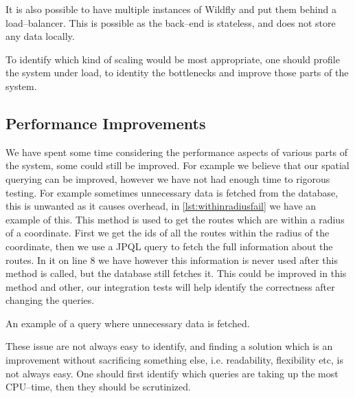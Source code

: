 It is also possible to have multiple instances of Wildfly and put them behind a load--balancer.
This is possible as the back--end is stateless, and does not store any data locally. 

To identify which kind of scaling would be most appropriate, one should profile the system under load, to identity the bottlenecks and improve those parts of the system. 

\subsection{Performance Improvements}
We have spent some time considering the performance aspects of various parts of the system, some could still be improved.
For example we believe that our spatial querying can be improved, however we have not had enough time to rigorous testing.
For example sometimes unnecessary data is fetched from the database, this is unwanted as it causes overhead, in \cref{lst:withinradiusfail} we have an example of this.
This method is used to get the routes which are within a radius of a coordinate.
First we get the ids of all the routes within the radius of the coordinate, then we use a \ac{JPQL} query to fetch the full information about the routes.
In it on line 8 we have  however this information is never used after this method is called, but the database still fetches it.
This could be improved in this method and other, our integration tests will help identify the correctness after changing the queries.
\begin{listing}
    \begin{java2}
        Set<Long> routes = routeIdsWithinRadius(waypointDao, coordinate, radius);
        if (routes.isEmpty())
            return new ArrayList<>();

        TypedQuery<Route> query = em.createQuery(
            "SELECT DISTINCT r " +
                "FROM Route r " +
                "JOIN FETCH r.points " +
                "JOIN FETCH r.vehicle v " +
                "JOIN FETCH r.driver d " +
                "WHERE r.id IN :routes",
            Route.class);

        query.setParameter("routes", routes);
        return query.getResultList();
    }
    \end{java2}
    \caption{An example of a query where unnecessary data is fetched.}
    \label{lst:withinradiusfail}
\end{listing}
These issue are not always easy to identify, and finding a solution which is an improvement without sacrificing something else, i.e. readability, flexibility etc, is not always easy.
One should first identify which queries are taking up the most CPU--time, then they should be scrutinized.  
